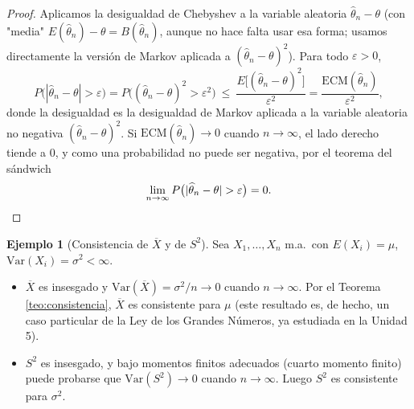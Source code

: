 \documentclass[11pt,a4paper]{article}
\theoremstyle{plain}
\theoremstyle{definition}
\newtheorem{ejemplo}[teorema]{Ejemplo}
\theoremstyle{remark}
\begin{document}
\begin{proof}
Aplicamos la desigualdad de Chebyshev a la variable aleatoria $\widehat\theta_n-\theta$ (con "media" $E(\widehat\theta_n)-\theta=B(\widehat\theta_n)$, aunque no hace falta usar esa forma; usamos directamente la versión de Markov aplicada a $(\widehat\theta_n-\theta)^2$). Para todo $\varepsilon>0$,
\[
P\big(|\widehat\theta_n-\theta|>\varepsilon\big) = P\big((\widehat\theta_n-\theta)^2 > \varepsilon^2\big) \ \le\ \frac{E\big[(\widehat\theta_n-\theta)^2\big]}{\varepsilon^2} = \frac{\mathrm{ECM}(\widehat\theta_n)}{\varepsilon^2},
\]
donde la desigualdad es la desigualdad de Markov aplicada a la variable aleatoria no negativa $(\widehat\theta_n-\theta)^2$. Si $\mathrm{ECM}(\widehat\theta_n)\to 0$ cuando $n\to\infty$, el lado derecho tiende a $0$, y como una probabilidad no puede ser negativa, por el teorema del sándwich
\[
\lim_{n\to\infty} P\big(|\widehat\theta_n-\theta|>\varepsilon\big) = 0. \qedhere
\]
\end{proof}

\begin{ejemplo}[Consistencia de $\overline X$ y de $S^2$]
Sea $X_1,\dots,X_n$ m.a.\ con $E(X_i)=\mu$, $\mathrm{Var}(X_i)=\sigma^2<\infty$.
\begin{itemize}
\item $\overline X$ es insesgado y $\mathrm{Var}(\overline X)=\sigma^2/n \to 0$ cuando $n\to\infty$. Por el Teorema \ref{teo:consistencia}, $\overline X$ es consistente para $\mu$ (este resultado es, de hecho, un caso particular de la Ley de los Grandes Números, ya estudiada en la Unidad 5).
\item $S^2$ es insesgado, y bajo momentos finitos adecuados (cuarto momento finito) puede probarse que $\mathrm{Var}(S^2)\to 0$ cuando $n\to\infty$. Luego $S^2$ es consistente para $\sigma^2$.
\end{itemize}
\end{ejemplo}
\end{document}
